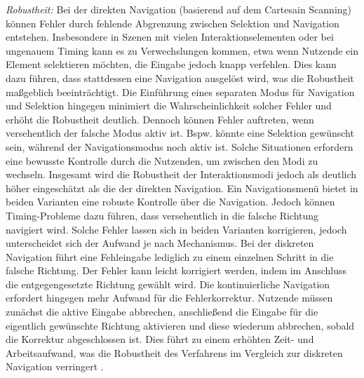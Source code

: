 \textit{Robustheit:}
Bei der direkten Navigation (basierend auf dem Cartesain Scanning) können Fehler durch fehlende Abgrenzung zwischen Selektion und Navigation entstehen. Insbesondere in Szenen mit vielen Interaktionselementen oder bei ungenauem Timing kann es zu Verwechslungen kommen, etwa wenn Nutzende ein Element selektieren möchten, die Eingabe jedoch knapp verfehlen. Dies kann dazu führen, dass stattdessen eine Navigation ausgelöst wird, was die Robustheit maßgeblich beeinträchtigt. Die Einführung eines separaten Modus für Navigation und Selektion hingegen minimiert die Wahrscheinlichkeit solcher Fehler und erhöht die Robustheit deutlich. Dennoch können Fehler auftreten, wenn versehentlich der falsche Modus aktiv ist. Bspw. könnte eine Selektion gewünscht sein, während der Navigationsmodus noch aktiv ist. Solche Situationen erfordern eine bewusste Kontrolle durch die Nutzenden, um zwischen den Modi zu wechseln. Insgesamt wird die Robustheit der Interaktionsmodi jedoch als deutlich höher eingeschätzt als die der direkten Navigation.
Ein Navigationsmenü bietet in beiden Varianten eine robuste Kontrolle über die Navigation. Jedoch können Timing-Probleme dazu führen, dass versehentlich in die falsche Richtung navigiert wird. Solche Fehler lassen sich in beiden Varianten korrigieren, jedoch unterscheidet sich der Aufwand je nach Mechanismus. Bei der diskreten Navigation führt eine Fehleingabe lediglich zu einem einzelnen Schritt in die falsche Richtung. Der Fehler kann leicht korrigiert werden, indem im Anschluss die entgegengesetzte Richtung gewählt wird. Die kontinuierliche Navigation erfordert hingegen mehr Aufwand für die Fehlerkorrektur. Nutzende müssen zunächst die aktive Eingabe abbrechen, anschließend die Eingabe für die eigentlich gewünschte Richtung aktivieren und diese wiederum abbrechen, sobald die Korrektur abgeschlossen ist. Dies führt zu einem erhöhten Zeit- und Arbeitsaufwand, was die Robustheit des Verfahrens im Vergleich zur diskreten Navigation verringert \citep{10.1145/2159365.2159386}. 


